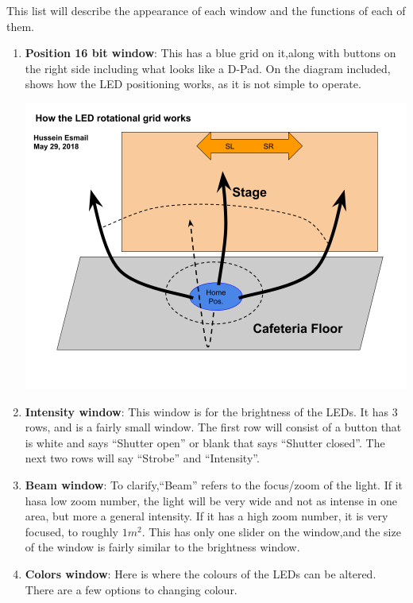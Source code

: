 \documentclass{article}
\begin{document}
This list will describe the appearance of each window and the functions of each of them.
\begin{enumerate}
    \item \textbf{Position 16 bit window}: This has a blue grid on it,along with buttons on the right side including what looks like a D-Pad. On the diagram included, shows how the LED positioning works, as it is not simple to operate. 
    \begin{center}
        \includegraphics[width=\textwidth, keepaspectratio]{LED_Rotational_Grid.png}
    \end{center}
    \item \textbf{Intensity window}: This window is for the brightness of the LEDs. It has 3 rows, and is a fairly small window. The first row will consist of a button that is white and says ``Shutter open'' or blank that says ``Shutter closed''. The next two rows will say ``Strobe'' and ``Intensity''.
    \item \textbf{Beam window}: To clarify,``Beam'' refers to the focus/zoom of the light. If it hasa low zoom number, the light will be very wide and not as intense in one area, but more a general intensity. If it has a high zoom number, it is very focused, to roughly $1m^2$. This has only one slider on the window,and the size of the window is fairly similar to the brightness window.
    \item \textbf{Colors window}: Here is where the colours of the LEDs can be altered. There are a few options to changing colour.
    \begin{center}

\end{center}
\end{enumerate}
\end{document}
